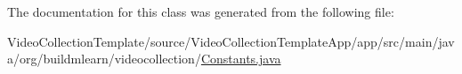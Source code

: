 The documentation for this class was generated from the following file\+:\begin{DoxyCompactItemize}
\item 
Video\+Collection\+Template/source/\+Video\+Collection\+Template\+App/app/src/main/java/org/buildmlearn/videocollection/\hyperlink{VideoCollectionTemplate_2source_2VideoCollectionTemplateApp_2app_2src_2main_2java_2org_2buildmle49be39280111968269347efc863f0676}{Constants.\+java}\end{DoxyCompactItemize}
